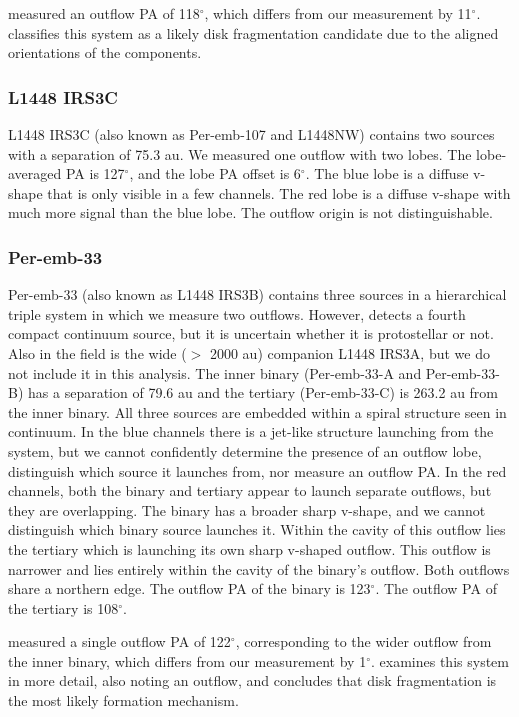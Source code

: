 \documentclass[linenumbers,twocolumn, twocolappendix]{aastex631}
\begin{document}
\cite{Stephens_et_al_2017} measured an outflow PA of 118$^\circ$, which differs from our measurement by 11$^\circ$. \cite{Reynolds_et_al_2024} classifies this system as a likely disk fragmentation candidate due to the aligned orientations of the components.

\subsubsection{L1448 IRS3C}
L1448 IRS3C (also known as Per-emb-107 and L1448NW) contains two sources with a separation of 75.3 au. We measured one outflow with two lobes. The lobe-averaged PA is 127$^\circ$, and the lobe PA offset is 6$^\circ$. The blue lobe is a diffuse v-shape that is only visible in a few channels. The red lobe is a diffuse v-shape with much more signal than the blue lobe. The outflow origin is not distinguishable.

\subsubsection{Per-emb-33}
Per-emb-33 (also known as L1448 IRS3B) contains three sources in a hierarchical triple system in which we measure two outflows. However, \cite{Reynolds_et_al_2024} detects a fourth compact continuum source, but it is uncertain whether it is protostellar or not. Also in the field is the wide ($>$ 2000 au) companion L1448 IRS3A, but we do not include it in this analysis. The inner binary (Per-emb-33-A and Per-emb-33-B) has a separation of 79.6 au and the tertiary (Per-emb-33-C) is 263.2 au from the inner binary. All three sources are embedded within a spiral structure seen in continuum. In the blue channels there is a jet-like structure launching from the system, but we cannot confidently determine the presence of an outflow lobe, distinguish which source it launches from, nor measure an outflow PA. In the red channels, both the binary and tertiary appear to launch separate outflows, but they are overlapping. The binary has a broader sharp v-shape, and we cannot distinguish which binary source launches it. Within the cavity of this outflow lies the tertiary which is launching its own sharp v-shaped outflow. This outflow is narrower and lies entirely within the cavity of the binary's outflow. Both outflows share a northern edge. The outflow PA of the binary is 123$^\circ$. The outflow PA of the tertiary is  108$^\circ$. 

\cite{Lee_2015} measured a single outflow PA of 122$^\circ$, corresponding to the wider outflow from the inner binary, which differs from our measurement by 1$^\circ$. \cite{Reynolds_et_al_2021} examines this system in more detail, also noting an outflow, and concludes that disk fragmentation is the most likely formation mechanism.
\end{document}
